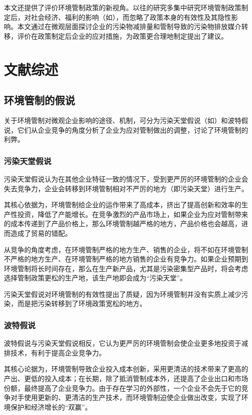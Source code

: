 \documentclass{ctexart}
\begin{document}
本文还提供了评价环境管制政策的新视角。以往的研究多集中研究环境管制政策制定后，对社会经济、福利的影响（如\textcite{muller2009efficient}），而忽略了政策本身的有效性及其隐性影响。本文通过在微观层面探讨企业的污染物减排量和管制导致的污染物排放媒介转移，评价在政策制定后企业的应对措施，为政策更合理地制定提出了建议。


\section{文献综述}
\subsection{环境管制的假说}
关于环境管制对微观企业影响的途径、机制，可分为污染天堂假说（如\textcite{mcguire1982regulation}）和波特假说\cite{porter1995green,porter1995toward}，它们从企业竞争的角度分析了企业为应对管制做出的调整，讨论了环境管制的利弊。
\subsubsection{污染天堂假说}
污染天堂假说认为在其他企业特征一致的情况下，受到更严厉的环境管制的企业会失去竞争力，企业会转移到环境管制相对不严厉的地方（即污染天堂）进行生产。

其核心依据为，环境管制给企业的运作带来了高成本，挤出了提高创新和效率的生产性投资，降低了产能增长。在竞争激烈的产品市场上，如果企业为应对管制带来的成本传递到了产品价格上，那么环境管制越严格的地方，产品价格也会越高，进而造成了贸易的错配。

从竞争的角度考虑，在环境管制严格的地方生产、销售的企业，将不如在环境管制不严格的地方生产、在环境管制严格的地方销售的企业有竞争力。如果企业预期到环境管制将长时间存在，那么在生产新产品，尤其是污染密集型产品时，将会考虑选择管制政策更松的生产地，该生产地即会成为“污染天堂”\cite{dechezlepretre2017impacts}。

污染天堂假说对环境管制的有效性提出了质疑，因为环境管制并没有实质上减少污染，而是把污染转移到了环境政策宽松的地方。
\subsubsection{波特假说}
波特假说与污染天堂假说相反，它认为更严厉的环境管制会使企业更多地投资于减排技术，有利于提高企业竞争力。

其核心论据为，环境管制导致企业投入成本创新，采用更清洁的技术带来了更高的产出、更低的投入成本；在长期，除了抵消管制成本外，还提高了企业出口和市场份额，最终提高了企业竞争力。由于存在学习的外部性，一个企业不会先于它的竞争对手使用更新的、更清洁的生产技术，而环境管制迫使企业做出改变，实现了环境保护和经济增长的“双赢”\cite{王兵2008环境管制与全要素生产率增长}。
\end{document}
